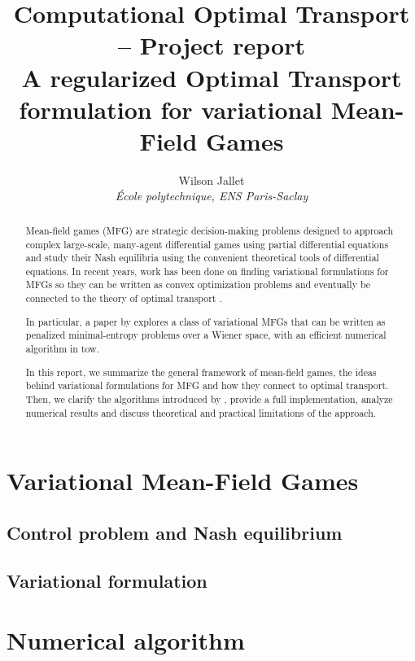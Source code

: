 \documentclass[11pt]{article}
\author{
	Wilson Jallet\\
	\textit{École polytechnique, ENS Paris-Saclay}
}
\title{
	{\Large\sffamily Computational Optimal Transport -- Project report}\\
	{\Large A regularized Optimal Transport formulation for variational Mean-Field Games}}
\numberwithin{equation}{section}
\theoremstyle{definition}
\begin{document}
\maketitle


\begin{abstract}
	Mean-field games (MFG) are strategic decision-making problems designed to approach complex large-scale, many-agent differential games using partial differential equations and study their Nash equilibria using the convenient theoretical tools of differential equations. In recent years, work has been done on finding variational formulations for MFGs so they can be written as convex optimization problems and eventually be connected to the theory of optimal transport \cite{benamou:hal-01295299,benamou2015lagrangian}.
	
	In particular, a paper by \textcite{benamou2018entropy} explores a class of variational MFGs that can be written as penalized minimal-entropy problems over a Wiener space, with an efficient numerical algorithm in tow.
	
	In this report, we summarize the general framework of mean-field games, the ideas behind variational formulations for MFG and how they connect to optimal transport. Then, we clarify the algorithms introduced by \cite{benamou2018entropy}, provide a full implementation, analyze numerical results and discuss theoretical and practical limitations of the approach.
\end{abstract}



\section{Variational Mean-Field Games}

\subsection{Control problem and Nash equilibrium}



\subsection{Variational formulation}




\section{Numerical algorithm}
\end{document}
